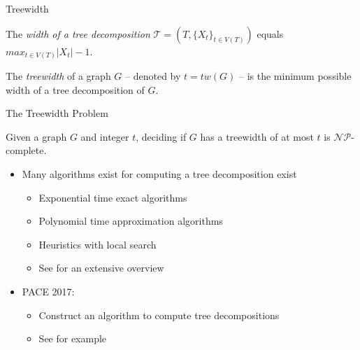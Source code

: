 \documentclass[11pt,t, usenames, dvipsnames]{beamer}
\newcommand{\NP}{\mathcal{NP}}
\newcommand{\T}{\mathcal{T}}
\begin{document}
\begin{frame}{Treewidth}
    \begin{definition}
        The \textit{width of a tree decomposition} $\T=(T, \{X_t\}_{t \in V(T)})$ equals $max_{t \in V(T)} |X_t| - 1$.
    \end{definition}
    
    \begin{definition}
        The \textit{treewidth} of a graph $G$ -- denoted by $t=tw(G)$ -- is the minimum possible width of a tree decomposition of $G$.
    \end{definition}
    
\end{frame}

\begin{frame}{The Treewidth Problem}
    \begin{theorem}
        Given a graph $G$ and integer $t$, deciding if $G$ has a treewidth of at most $t$ is $\NP$-complete. 
    \end{theorem}
    
    \begin{itemize}
        \item<2-> Many algorithms exist for computing a tree decomposition exist 
        \begin{itemize}
            \item Exponential time exact algorithms
            \item Polynomial time approximation algorithms
            \item Heuristics with local search 
            \item See \cite{bodlaender2005discovering} for an extensive overview
        \end{itemize}
        \item<3-> PACE 2017: \cite{dell2018pace}
        \begin{itemize}
            \item Construct an algorithm to compute tree decompositions
            \item See for example \cite{tamaki2019positive, strasser2017computing, bannach2019practical}
        \end{itemize}
    \end{itemize}
\end{frame}
\end{document}
